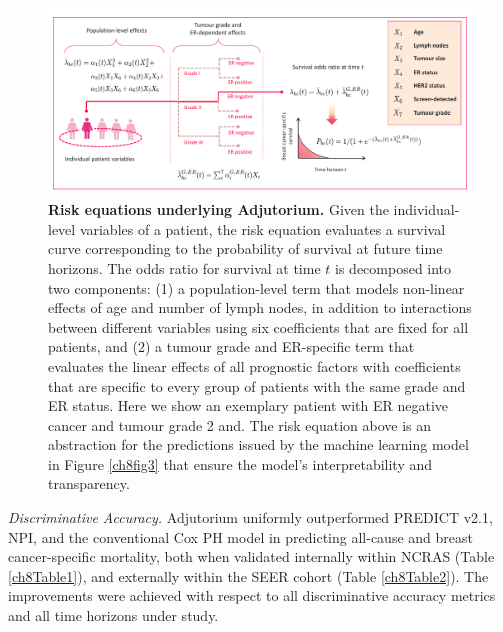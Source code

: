 \documentclass [PhD] {uclathes}
\begin{document}
\afterpage{\clearpage}
\begin{figure}
\centering
   \includegraphics[width=9in]{ch8Fig4.pdf}
    \caption{{\bf Risk equations underlying Adjutorium.} Given the individual-level variables of a patient, the risk equation evaluates a survival curve corresponding to the probability of survival at future time horizons. The odds ratio for survival at time $t$ is decomposed into two components: (1) a population-level term that models non-linear effects of age and number of lymph nodes, in addition to interactions between different variables using six coefficients that are fixed for all patients, and (2) a tumour grade and ER-specific term that evaluates the linear effects of all prognostic factors with coefficients that are specific to every group of patients with the same grade and ER status. Here we show an exemplary patient with ER negative cancer and tumour grade 2 and. The risk equation above is an abstraction for the predictions issued by the machine learning model in Figure \ref{ch8fig3} that ensure the model's interpretability and transparency.}
    \label{ch8fig4}
\end{figure} 

{\it Discriminative Accuracy.} Adjutorium uniformly outperformed PREDICT v2.1, NPI, and the conventional Cox PH model in predicting all-cause and breast cancer-specific mortality, both when validated internally within NCRAS (Table \ref{ch8Table1}), and externally within the SEER cohort (Table \ref{ch8Table2}). The improvements were achieved with respect to all discriminative accuracy metrics and all time horizons under study. 
\end{document}
